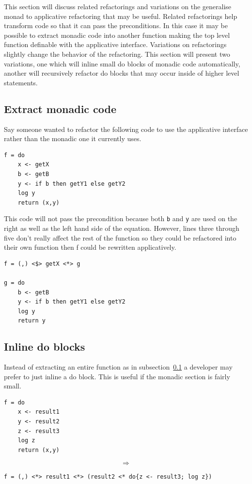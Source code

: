 This section will discuss related refactorings and variations on the generalise monad to applicative refactoring that may be useful. Related refactorings help transform code so that it can pass the preconditions. In this case it may be possible to extract monadic code into another function making the top level function definable with the applicative interface. Variations on refactorings slightly change the behavior of the refactoring. This section will present two variations, one which will inline small do blocks of monadic code automatically, another will
recursively refactor do blocks that may occur inside of higher level statements.

\subsection{Extract monadic code}
\label{subSec:extract}
Say someone wanted to refactor the following code to use the applicative interface rather than the monadic one it currently uses.

\begin{lstlisting}[frame=tblr]
f = do
	x <- getX
	b <- getB
	y <- if b then getY1 else getY2
	log y
	return (x,y)	
\end{lstlisting}

This code will not pass the precondition because both \texttt{b} and \texttt{y} are used on the right as well as the left hand side of the equation. However, lines three through five don't really affect the rest of the function so they could be refactored into their own function then f could be rewritten applicatively.

\begin{lstlisting}[frame=tblr]
f = (,) <$> getX <*> g

g = do
	b <- getB
	y <- if b then getY1 else getY2
	log y
	return y
\end{lstlisting}

\subsection{Inline do blocks}
Instead of extracting an entire function as in subsection~\ref{subSec:extract} a developer may prefer to just inline a do block. This is useful if the monadic section is fairly small.

\begin{lstlisting}[frame=tblr]
f = do
	x <- result1
	y <- result2
	z <- result3
	log z
	return (x,y)
\end{lstlisting}
\larger[5]
\[\Rightarrow\]
\normalsize
\begin{lstlisting}[frame=tblr]
f = (,) <*> result1 <*> (result2 <* do{z <- result3; log z})
\end{lstlisting}

